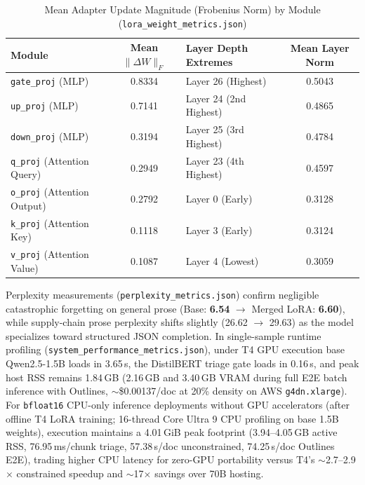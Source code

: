 \documentclass[11pt,a4paper]{article}
\begin{document}
\begin{table}[htbp]
\centering
\caption{Mean Adapter Update Magnitude (Frobenius Norm) by Module (\texttt{lora\_weight\_metrics.json})}
\label{tab:lora_norms}
\small
\begin{tabular}{@{}l c l c@{}}
\toprule
\textbf{Module} & \textbf{Mean $\|\Delta W\|_F$} & \textbf{Layer Depth Extremes} & \textbf{Mean Layer Norm} \\
\midrule
\texttt{gate\_proj} (MLP) & 0.8334 & Layer 26 (Highest) & 0.5043 \\
\texttt{up\_proj} (MLP) & 0.7141 & Layer 24 (2nd Highest) & 0.4865 \\
\texttt{down\_proj} (MLP) & 0.3194 & Layer 25 (3rd Highest) & 0.4784 \\
\texttt{q\_proj} (Attention Query) & 0.2949 & Layer 23 (4th Highest) & 0.4597 \\
\texttt{o\_proj} (Attention Output) & 0.2792 & Layer 0 (Early) & 0.3128 \\
\texttt{k\_proj} (Attention Key) & 0.1118 & Layer 3 (Early) & 0.3124 \\
\texttt{v\_proj} (Attention Value) & 0.1087 & Layer 4 (Lowest) & 0.3059 \\
\bottomrule
\end{tabular}
\end{table}

Perplexity measurements (\texttt{perplexity\_metrics.json}) confirm negligible catastrophic forgetting on general prose (Base: \textbf{6.54} $\to$ Merged LoRA: \textbf{6.60}), while supply-chain prose perplexity shifts slightly (26.62 $\to$ 29.63) as the model specializes toward structured JSON completion. In single-sample runtime profiling (\texttt{system\_performance\_metrics.json}), under T4 GPU execution base Qwen2.5-1.5B loads in 3.65\,s, the DistilBERT triage gate loads in 0.16\,s, and peak host RSS remains 1.84\,GB (2.16\,GB and 3.40\,GB VRAM during full E2E batch inference with Outlines, $\sim$\$0.00137/doc at 20\% density on AWS \texttt{g4dn.xlarge}). For \texttt{bfloat16} CPU-only inference deployments without GPU accelerators (after offline T4 LoRA training; 16-thread Core Ultra 9 CPU profiling on base 1.5B weights), execution maintains a 4.01\,GiB peak footprint (3.94--4.05\,GB active RSS, 76.95\,ms/chunk triage, 57.38\,s/doc unconstrained, 74.25\,s/doc Outlines E2E), trading higher CPU latency for zero-GPU portability versus T4's $\sim$2.7--2.9$\times$ constrained speedup and $\sim$17$\times$ savings over 70B hosting.
\end{document}
